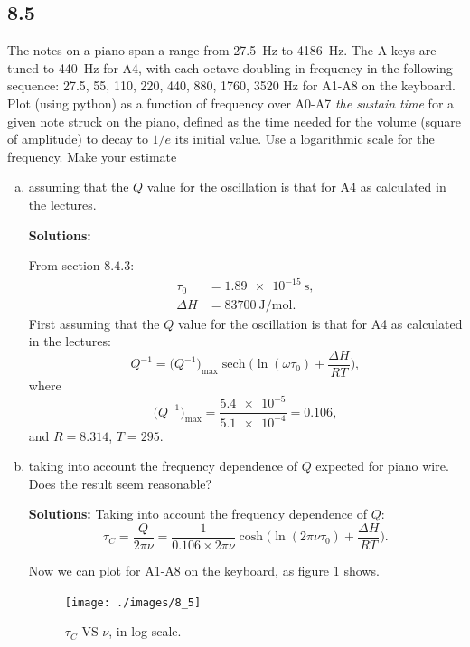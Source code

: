 \documentclass[12pt]{article}
\DeclareMathOperator{\sech}{sech}
\begin{document}
\subsection{8.5}
The notes on a piano span a range from \SI{27.5}{\hertz} to \SI{4186}{\hertz}.
The A keys are tuned to \SI{440}{\hertz} for A4, with each octave doubling in frequency
in the following sequence: 27.5, 55, 110, 220, 440, 880, 1760, 3520 Hz for A1-A8 on
the keyboard.  Plot (using python) as a function of frequency over A0-A7 \emph{the sustain time}
for a given note struck on the piano, defined as the time needed for the volume (square of amplitude)
to decay to $1/e$ its initial value.  Use a logarithmic scale for the frequency. Make your estimate
\begin{enumerate}[a)]
  \item assuming that the $Q$ value for the oscillation is that for A4 as calculated in the lectures.

        \textbf{Solutions:}

        From section $8.4.3$:
        \begin{align}
          \tau_0   & = \SI{1.89e-15}{\second},        \\
          \Delta H & = \SI{83700}{\joule \per \mole}.
        \end{align}
        First assuming that the $Q$ value for the oscillation is that for A4 as calculated in the lectures:
        \begin{equation}
          Q^{-1} = \big( Q^{-1} \big)_\text{max} \sech \bigg( \ln(\omega \tau_0) + \frac{ \Delta H }{ R T } \bigg),
        \end{equation}
        where
        \begin{equation}
          \big( Q^{-1} \big)_\text{max} = \frac{ \num{5.4e-5} }{ \num{5.1e-4} } = 0.106,
        \end{equation}
        and $R = 8.314$, $T = 295$.
  \item taking into account the frequency dependence of $Q$ expected for piano wire. Does the result seem reasonable?

        \textbf{Solutions:}
        Taking into account the frequency dependence of $Q$:
        \begin{equation}
          \tau_C = \frac{ Q }{ 2 \pi \nu } = \frac{ 1 }{ 0.106 \times 2 \pi \nu } \cosh \bigg( \ln(2 \pi \nu \tau_0) + \frac{ \Delta H }{ R T } \bigg).
        \end{equation}

        Now we can plot for A1-A8 on the keyboard, as figure \ref{fig:tauc} shows.
        \begin{figure}[h]
          \centering
          \texttt{[image: ./images/8\_5]}
          \caption{$\tau_C$ VS $\nu$, in log scale.}
          \label{fig:tauc}
        \end{figure}


\end{enumerate}
\end{document}
